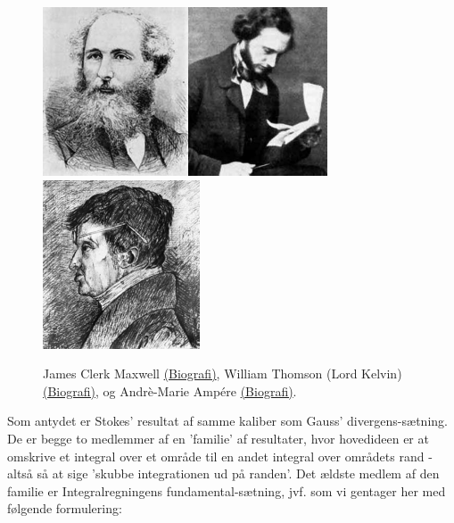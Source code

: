 \begin{figure}[h]
\centerline{\includegraphics[height=50mm]{FIGS/PERSMaxwell_8}\qquad\includegraphics[height=50mm]{FIGS/Thomson01}\qquad\includegraphics[height=50mm]{FIGS/Ampere_9}}
\begin{center}
\caption{\small{James Clerk Maxwell \href{http://www-history.mcs.st-and.ac.uk/Mathematicians/Maxwell.html}{(Biografi)},
William Thomson (Lord Kelvin)  \href{http://www-history.mcs.st-and.ac.uk/Mathematicians/Thomson.html}{(Biografi)}, og
Andr\`{e}-Marie Amp\'{e}re  \href{http://www-history.mcs.st-and.ac.uk/Mathematicians/Ampere.html}{(Biografi)}.}} \label{figStokesKelvinAmpere}
\end{center}
\end{figure}




Som antydet er Stokes' resultat af
samme kaliber som Gauss' divergens-sætning. De er
begge to medlemmer af en 'familie' af resultater,
hvor hovedideen er at omskrive et integral over
et område til en andet integral over områdets
rand - altså så at sige 'skubbe integrationen ud
på randen'. Det ældste medlem af den familie er
Integralregningens fundamental-sætning, jvf.  
som vi gentager her med følgende formulering:

